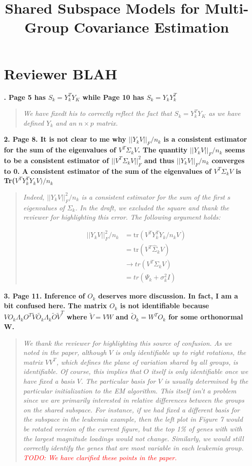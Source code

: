 \documentclass{article}
\title{Shared Subspace Models for Multi-Group Covariance Estimation}
\newcommand{\tr}{\text{tr}}
\newenvironment{resp}{\begin{quotation}\noindent\slshape}{\end{quotation}}
\newcommand{\todo}[1]{{\textsf{\textcolor{red}{TODO: #1}}}}
\begin{document}
\section{Reviewer BLAH}

\textbf{. Page 5 has $S_k = Y_k^TY_K$ while Page 10 has $S_k = Y_kY_k^T$}

\begin{resp}
We have fixedt his to correctly reflect the fact that $S_k = Y_k^TY_K$ as we have defined $Y_k$ and an $n \times p$ matrix.
\end{resp}

\noindent   \textbf{2. Page 8. It is not clear to me why $||Y_kV||_F/n_k$ is a consistent estimator for the sum
of the eigenvalues of $V^T\Sigma_kV$. The quantity  $||Y_kV||_F/n_k$  seems to be a consistent estimator of $||V^T\Sigma_kV||^2_F$ and thus $||Y_kV||_F/n_k$ converges to 0. A consistent estimator of the sum of the eigenvalues of $V^T\Sigma_kV$ is Tr($V^TY_k^TY_kV)/n_k$}

\begin{resp}
Indeed, $||Y_kV||^2_F/n_k$ is a consistent estimator for the sum of the first $s$ eigenvalues of $\Sigma_k$.  In the draft, we excluded the square and thank the reviewer for highlighting this error.  The following argument holds:

\begin{align*}
||Y_kV||_F^2/n_k &= \tr (V^TY_k^TY_k/n_kV)\\
&= \tr (V^T\hat{\Sigma}_kV)\\
&\to tr(V^T\Sigma_kV)\\
& = tr(\Psi_k + \sigma_k^2I)
\end{align*}

\end{resp}

\noindent \textbf{3. Page 11. Inference of $O_k$ deserves more discussion. In fact, I am a bit confused here. The matrix $O_k$ is not identifiable because $VO_k\Lambda_kO^T \tilde{V}\tilde{O_k}Λ_k\tilde{O}\tilde{V}^T$ where $\tilde{V} = VW$ and $\tilde{O}_k = W^TO_k$ for some orthonormal W.}

\begin{resp}
We thank the reviewer for highlighting this source of confusion.  As we noted in the paper, although $V$ is only identifiable up to right rotations, the matrix $VV^T$, which defines
the plane of variation shared by all groups, is identifiable. Of course, this implies that $O$ itself is only identifiable once we have fixed a basis $V$.  The particular basis for $V$ is usually determined by the particular initialization to the EM algorithm. This itself isn't a problem since we are primarily interested in relative differences between the groups on the shared subspace.  For instance, if we had fixed a different basis for the subspace in the leukemia example, then the left plot in Figure 7 would be rotated version of the current figure, but the top 1\% of genes with with the largest magnitude loadings would not change.  Similarly, we would still correctly identify the genes that are most variable in each leukemia group. \todo{We have clarified these points in the paper.}
\end{resp}
\end{document}
